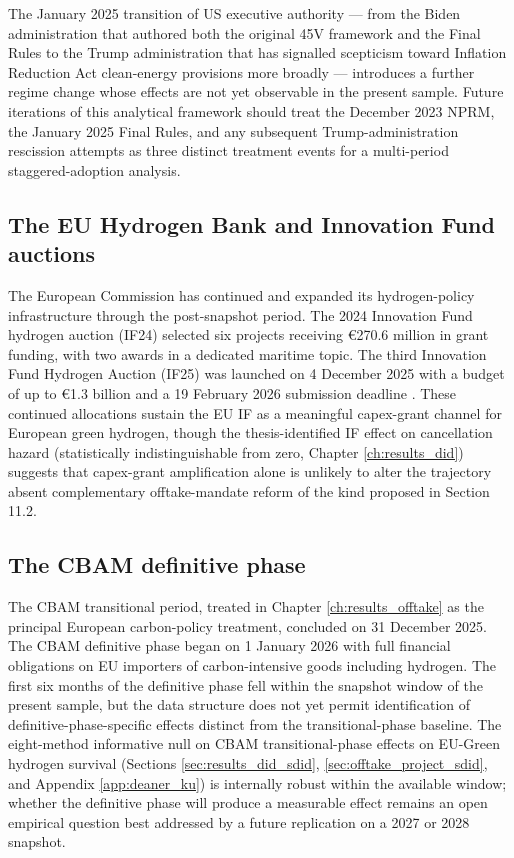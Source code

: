The January 2025 transition of US executive authority --- from the Biden administration that authored both the original 45V framework and the Final Rules to the Trump administration that has signalled scepticism toward Inflation Reduction Act clean-energy provisions more broadly --- introduces a further regime change whose effects are not yet observable in the present sample. Future iterations of this analytical framework should treat the December 2023 NPRM, the January 2025 Final Rules, and any subsequent Trump-administration rescission attempts as three distinct treatment events for a multi-period staggered-adoption analysis.

\subsection*{The EU Hydrogen Bank and Innovation Fund auctions}

The European Commission has continued and expanded its hydrogen-policy infrastructure through the post-snapshot period. The 2024 Innovation Fund hydrogen auction (IF24) selected six projects receiving \euro 270.6 million in grant funding, with two awards in a dedicated maritime topic. The third Innovation Fund Hydrogen Auction (IF25) was launched on 4 December 2025 with a budget of up to \euro 1.3 billion and a 19 February 2026 submission deadline \cite{eu2025innovationfund}. These continued allocations sustain the EU IF as a meaningful capex-grant channel for European green hydrogen, though the thesis-identified IF effect on cancellation hazard (statistically indistinguishable from zero, Chapter \ref{ch:results_did}) suggests that capex-grant amplification alone is unlikely to alter the trajectory absent complementary offtake-mandate reform of the kind proposed in Section 11.2.

\subsection*{The CBAM definitive phase}

The CBAM transitional period, treated in Chapter \ref{ch:results_offtake} as the principal European carbon-policy treatment, concluded on 31 December 2025. The CBAM definitive phase began on 1 January 2026 with full financial obligations on EU importers of carbon-intensive goods including hydrogen. The first six months of the definitive phase fell within the snapshot window of the present sample, but the data structure does not yet permit identification of definitive-phase-specific effects distinct from the transitional-phase baseline. The eight-method informative null on CBAM transitional-phase effects on EU-Green hydrogen survival (Sections \ref{sec:results_did_sdid}, \ref{sec:offtake_project_sdid}, and Appendix \ref{app:deaner_ku}) is internally robust within the available window; whether the definitive phase will produce a measurable effect remains an open empirical question best addressed by a future replication on a 2027 or 2028 snapshot.

